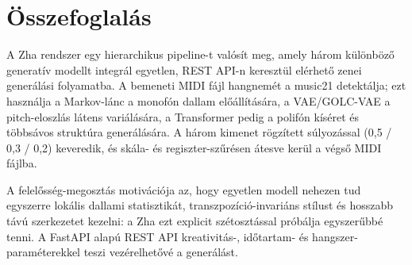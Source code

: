 \section{Összefoglalás}

A Zha rendszer egy hierarchikus pipeline-t valósít meg, amely három különböző generatív modellt integrál egyetlen, REST API-n keresztül elérhető zenei generálási folyamatba. A bemeneti MIDI fájl hangnemét a music21 detektálja; ezt használja a Markov-lánc a monofón dallam előállítására, a VAE/GOLC-VAE a pitch-eloszlás látens variálására, a Transformer pedig a polifón kíséret és többsávos struktúra generálására. A három kimenet rögzített súlyozással (0,5 / 0,3 / 0,2) keveredik, és skála- és regiszter-szűrésen átesve kerül a végső MIDI fájlba.

A felelősség-megosztás motivációja az, hogy egyetlen modell nehezen tud egyszerre lokális dallami statisztikát, transzpozíció-invariáns stílust és hosszabb távú szerkezetet kezelni: a Zha ezt explicit szétosztással próbálja egyszerűbbé tenni. A FastAPI alapú REST API kreativitás-, időtartam- és hangszer-paraméterekkel teszi vezérelhetővé a generálást.